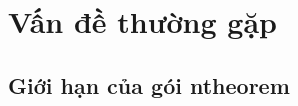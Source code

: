 \section{\texorpdfstring{Vấn đề thường gặp}{Van de thuong gap}}

\subsection{\texorpdfstring{Giới hạn của gói}{Gioi han cua goi} ntheorem}


